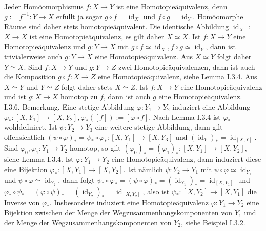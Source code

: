 \documentclass[10pt]{article}
\begin{document}
Jeder Homöomorphismus $f: X \rightarrow Y$ ist eine Homotopieäquivalenz, denn $g:=f^{-1}: Y \rightarrow X$ erfüllt ja sogar $g \circ f=\operatorname{id}_{X}$ und $f \circ g=\operatorname{id}_{Y}$. Homöomorphe Räume sind daher stets homotopieäquivalent. Die identische Abbildung $\operatorname{id}_{X}$ : $X \rightarrow X$ ist eine Homotopieäquivalenz, es gilt daher $X \simeq X$. Ist $f: X \rightarrow Y$ eine Homotopieäquivalenz und $g: Y \rightarrow X$ mit $g \circ f \simeq \operatorname{id}_{X}, f \circ g \simeq \operatorname{id}_{Y}$, dann ist trivialerweise auch $g: Y \rightarrow X$ eine Homotopieäquivalenz. Aus $X \simeq Y$ folgt daher $Y \simeq X$. Sind $f: X \rightarrow Y$ und $g: Y \rightarrow Z$ zwei Homotopieäquivalenzen, dann ist auch die Komposition $g \circ f: X \rightarrow Z$ eine Homotopieäquivalenz, siehe Lemma I.3.4. Aus $X \simeq Y$ und $Y \simeq Z$ folgt daher stets $X \simeq Z$. Ist $f: X \rightarrow Y$ eine Homotopieäquivalenz und ist $g: X \rightarrow X$ homotop zu $f$, dann ist auch $g$ eine Homotopieäquivalenz.\\
I.3.6. Bemerkung. Eine stetige Abbildung $\varphi: Y_{1} \rightarrow Y_{2}$ induziert eine Abbildung $\varphi_{*}:\left[X, Y_{1}\right] \rightarrow\left[X, Y_{2}\right], \varphi_{*}([f]):=[\varphi \circ f]$. Nach Lemma I.3.4 ist $\varphi_{*}$ wohldefiniert. Ist $\psi: Y_{2} \rightarrow Y_{3}$ eine weitere stetige Abbildung, dann gilt offensichtlich $(\psi \circ \varphi)_{*}=\psi_{*} \circ \varphi_{*}:\left[X, Y_{1}\right] \rightarrow\left[X, Y_{3}\right]$ und $\left(\operatorname{id}_{Y}\right)_{*}=\operatorname{id}_{[X, Y]}$. Sind $\varphi_{0}, \varphi_{1}: Y_{1} \rightarrow Y_{2}$ homotop, so gilt $\left(\varphi_{0}\right)_{*}=\left(\varphi_{1}\right)_{*}:\left[X, Y_{1}\right] \rightarrow\left[X, Y_{2}\right]$, siehe Lemma I.3.4. Ist $\varphi: Y_{1} \rightarrow Y_{2}$ eine Homotopieäquivalenz, dann induziert diese eine Bijektion $\varphi_{*}:\left[X, Y_{1}\right] \rightarrow\left[X, Y_{2}\right]$. Ist nämlich $\psi: Y_{2} \rightarrow Y_{1}$ mit $\psi \circ \varphi \simeq \operatorname{id}_{Y_{1}}$ und $\psi \circ \varphi \simeq \operatorname{id}_{Y_{2}}$, dann folgt $\psi_{*} \circ \varphi_{*}=(\psi \circ \varphi)_{*}=\left(\operatorname{id}_{Y_{1}}\right)_{*}=\operatorname{id}_{\left[X, Y_{1}\right]}$ und $\varphi_{*} \circ \psi_{*}=(\varphi \circ \psi)_{*}=\left(\operatorname{id}_{Y_{2}}\right)_{*}=\operatorname{id}_{\left[X, Y_{2}\right]}$, also ist $\psi_{*}:\left[X, Y_{2}\right] \rightarrow\left[X, Y_{1}\right]$ die Inverse von $\varphi_{*}$. Insbesondere induziert eine Homotopieäquivalenz $\varphi: Y_{1} \rightarrow Y_{2}$ eine Bijektion zwischen der Menge der Wegzusammenhangskomponenten von $Y_{1}$ und der Menge der Wegzusammenhangskomponenten von $Y_{2}$, siehe Beispiel I.3.2.\\
\end{document}
